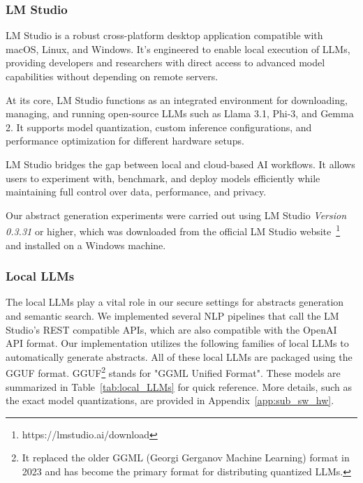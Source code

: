 \documentclass[bdcc,article,submit,pdftex,moreauthors]{Definitions/mdpi}
\newcommand{\commentRed}[1]{\textcolor{red}{#1}}
\begin{document}
\subsubsection{LM Studio}
LM Studio is a robust cross-platform desktop application compatible with macOS, Linux, and Windows. It's engineered to enable local execution of LLMs, providing developers and researchers with direct access to advanced model capabilities without depending on remote servers.

At its core, LM Studio functions as an integrated environment for downloading, managing, and running open-source LLMs such as Llama 3.1, Phi-3, and Gemma 2. It supports model quantization, custom inference configurations, and performance optimization for different hardware setups.

LM Studio bridges the gap between local and cloud-based AI workflows. It allows users to experiment with, benchmark, and deploy models efficiently while maintaining full control over data, performance, and privacy.

Our abstract generation experiments were carried out using LM Studio \textit{Version 0.3.31} or higher, which was downloaded from the official LM Studio website~\footnote{https://lmstudio.ai/download} and installed on a Windows machine.

\subsubsection{Local LLMs}
The local LLMs play a vital role in our secure settings for abstracts generation and semantic search.
We implemented several NLP pipelines that call the LM Studio's REST compatible APIs, which are also compatible with the OpenAI API format. Our implementation utilizes the following families of local LLMs to automatically generate abstracts. All of these local LLMs are packaged using the GGUF format. GGUF\footnote{It replaced the older GGML (Georgi Gerganov Machine Learning) format in 2023 and has become the primary format for distributing quantized LLMs.} stands for "GGML Unified Format".
These models are summarized in Table~\ref{tab:local_LLMs} for quick reference. More details, such as the exact model quantizations, are provided in Appendix~\ref{app:sub_sw_hw}.
\end{document}
